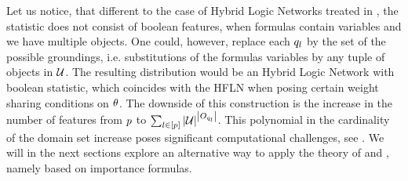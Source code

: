 Let us notice, that different to the case of Hybrid Logic Networks treated in , the statistic does not consist of boolean features, when formulas contain variables and we have multiple objects.
One could, however, replace each $q_{l}$ by the set of the possible groundings, i.e. substitutions of the formulas variables by any tuple of objects in $\mathcal{U}$.
The resulting distribution would be an Hybrid Logic Network with boolean statistic, which coincides with the HFLN when posing certain weight sharing conditions on $\theta$.
The downside of this construction is the increase in the number of features from $p$ to $\sum_{l\in[p]} \left|\mathcal{U}\right|^{\left|O_{q_{l}}\right|}$.
This polynomial in the cardinality of the domain set increase poses significant computational challenges, see \cite{richardson_markov_2006}.
We will in the next sections explore an alternative way to apply the theory of  and , namely based on importance formulas.




%









